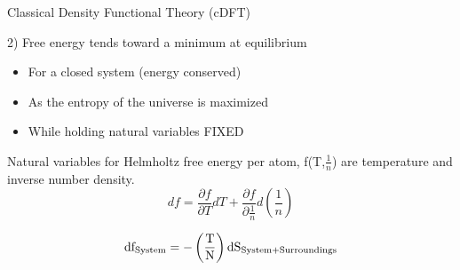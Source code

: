 \documentclass{beamer}
\renewcommand{\vec}[1]{\mathbf{#1}}
\begin{document}
\begin{frame}{Classical Density Functional Theory (cDFT)}
    \begin{block}{2) Free energy tends toward a minimum at equilibrium }
    \begin{itemize}
       \item For a closed system (energy conserved)
       \item As the entropy of the universe is maximized
       \item While holding natural variables FIXED
    \end{itemize}
    
       Natural variables for Helmholtz free energy per atom,  
       f(T,$\frac{1}{n}$) are temperature and inverse number density.
       \begin{displaymath}df=\frac{\partial f}{\partial T}dT + \frac{\partial f}{\partial \frac{1}{n}}d\left(\frac{1}{n}\right)\end{displaymath}
 
     
     \begin{displaymath} \text{df}_{\text{System}}=-\left(\frac{\text T}{\text N}\right)\text{dS}_{\text{System+Surroundings}} \end{displaymath}
     \end{block}     
\end{frame}
\end{document}
